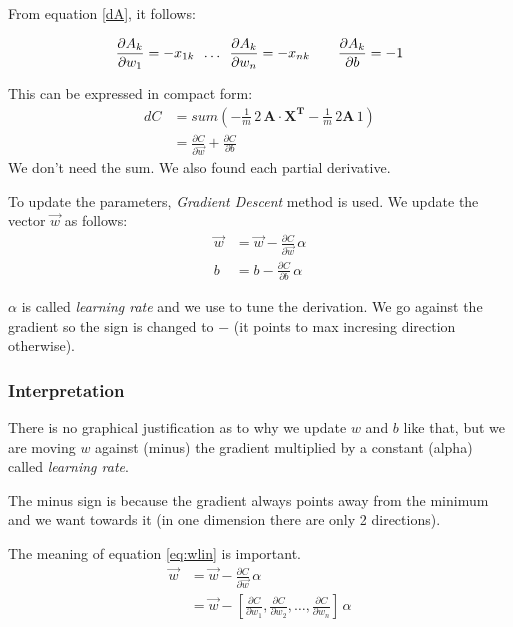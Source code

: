 From equation \ref{dA}, it follows:

\begin{center}
\begin{align*}
  \frac{\partial A_{k}}{\partial w_1} = -x_{1k} \hspace{0.5em} \ldots \hspace{0.5em}\frac{\partial A_{k}}{\partial w_n}= -x_{nk}\hspace{2em} \frac{\partial A_k}{\partial b} = -1
\end{align*} 
\end{center}

This can be expressed in compact form:
\begin{align}
  dC &= sum(-\frac{1}{m}\,{}2\,\mathbf{A}\cdot{}\mathbf{X^T} -\frac{1}{m}\,{}2\mathbf{A}\,{}1)\\
  &= \frac{\partial C}{\partial \vec{w}} + \frac{\partial C}{\partial b}  \nonumber
\end{align}
We don't need the sum. We also found each partial derivative.

To update the parameters, \textit{Gradient Descent} method is used. We update the vector $\vec{w}$ as follows:
\begin{align}
  \vec{w} &= \vec{w} -\frac{\partial C}{\partial \vec{w}}\,\alpha\label{eq:wlin}\\
  b &= b -\frac{\partial C}{\partial b}\,{}\alpha
\end{align}

$\alpha$ is called \textit{learning rate} and we use to tune the derivation. We go against the gradient so the sign is changed to $-$ (it points to max incresing direction otherwise).

\subsubsection{Interpretation}

There is no graphical justification as to why we update $w$ and $b$ like that, but we are moving $w$ against (minus) the gradient multiplied by a constant (alpha) called \textit{learning rate}.

The minus sign is because the gradient always points away from the minimum and we want towards it (in one dimension there are only 2 directions). 

The meaning of equation \ref{eq:wlin} is important.
\begin{align}
  \vec{w} &= \vec{w} -\frac{\partial C}{\partial \vec{w}}\,\alpha\\
  &= \vec{w} -[\frac{\partial C}{\partial w_1}, \frac{\partial C}{\partial w_2},\ldots, \frac{\partial C}{\partial w_n}]\,\alpha\\
\end{align}

